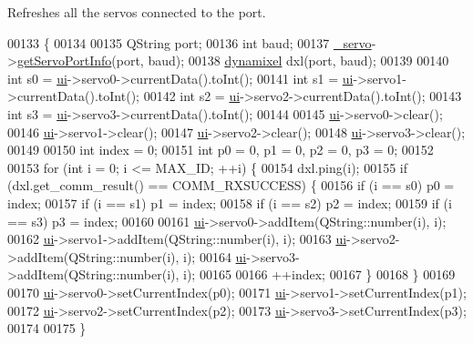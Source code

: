 Refreshes all the servos connected to the port. 


\begin{DoxyCode}
00133 \{
00134     
00135     QString port;
00136     \textcolor{keywordtype}{int} baud;
00137     \hyperlink{a00006_acba1566fea3f831000d5e1c1edc3e776}{\_servo}->\hyperlink{a00008_afcf834d93f1ac9663d6ebaab820e5f74}{getServoPortInfo}(port, baud);
00138     \hyperlink{a00004}{dynamixel} dxl(port, baud);
00139     
00140     \textcolor{keywordtype}{int} s0 = \hyperlink{a00006_a8347442d5b3b670e8fff0c4102db1f88}{ui}->servo0->currentData().toInt();
00141     \textcolor{keywordtype}{int} s1 = \hyperlink{a00006_a8347442d5b3b670e8fff0c4102db1f88}{ui}->servo1->currentData().toInt();
00142     \textcolor{keywordtype}{int} s2 = \hyperlink{a00006_a8347442d5b3b670e8fff0c4102db1f88}{ui}->servo2->currentData().toInt();
00143     \textcolor{keywordtype}{int} s3 = \hyperlink{a00006_a8347442d5b3b670e8fff0c4102db1f88}{ui}->servo3->currentData().toInt();
00144     
00145     \hyperlink{a00006_a8347442d5b3b670e8fff0c4102db1f88}{ui}->servo0->clear();
00146     \hyperlink{a00006_a8347442d5b3b670e8fff0c4102db1f88}{ui}->servo1->clear();
00147     \hyperlink{a00006_a8347442d5b3b670e8fff0c4102db1f88}{ui}->servo2->clear();
00148     \hyperlink{a00006_a8347442d5b3b670e8fff0c4102db1f88}{ui}->servo3->clear();
00149     
00150     \textcolor{keywordtype}{int} index = 0;
00151     \textcolor{keywordtype}{int} p0 = 0, p1 = 0, p2 = 0, p3 = 0;
00152     
00153     \textcolor{keywordflow}{for} (\textcolor{keywordtype}{int} i = 0; i <= MAX\_ID; ++i) \{
00154         dxl.ping(i);
00155         \textcolor{keywordflow}{if} (dxl.get\_comm\_result() == COMM\_RXSUCCESS) \{
00156             \textcolor{keywordflow}{if} (i == s0) p0 = index;
00157             \textcolor{keywordflow}{if} (i == s1) p1 = index;
00158             \textcolor{keywordflow}{if} (i == s2) p2 = index;
00159             \textcolor{keywordflow}{if} (i == s3) p3 = index;
00160             
00161             \hyperlink{a00006_a8347442d5b3b670e8fff0c4102db1f88}{ui}->servo0->addItem(QString::number(i), i);
00162             \hyperlink{a00006_a8347442d5b3b670e8fff0c4102db1f88}{ui}->servo1->addItem(QString::number(i), i);
00163             \hyperlink{a00006_a8347442d5b3b670e8fff0c4102db1f88}{ui}->servo2->addItem(QString::number(i), i);
00164             \hyperlink{a00006_a8347442d5b3b670e8fff0c4102db1f88}{ui}->servo3->addItem(QString::number(i), i);
00165             
00166             ++index;
00167         \}
00168     \}
00169     
00170     \hyperlink{a00006_a8347442d5b3b670e8fff0c4102db1f88}{ui}->servo0->setCurrentIndex(p0);
00171     \hyperlink{a00006_a8347442d5b3b670e8fff0c4102db1f88}{ui}->servo1->setCurrentIndex(p1);
00172     \hyperlink{a00006_a8347442d5b3b670e8fff0c4102db1f88}{ui}->servo2->setCurrentIndex(p2);
00173     \hyperlink{a00006_a8347442d5b3b670e8fff0c4102db1f88}{ui}->servo3->setCurrentIndex(p3);
00174         
00175 \}
\end{DoxyCode}
\hypertarget{a00006_ab0a56ad7347c20046602a7a2a1c83397}{}
